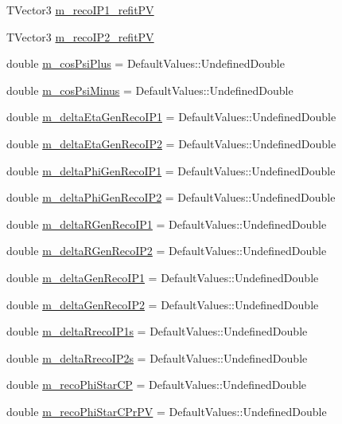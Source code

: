 \begin{DoxyCompactItemize}
\item 
TVector3 \hyperlink{classHttProduct_aea4fe73c340c52db4fe5a427d2cf9be5}{m\_\-recoIP1\_\-refitPV}
\item 
TVector3 \hyperlink{classHttProduct_ab6f1595deb54f67149fdcc3a30adf7fa}{m\_\-recoIP2\_\-refitPV}
\item 
double \hyperlink{classHttProduct_aff72a2230f489c350ef7c9e484ad1fe6}{m\_\-cosPsiPlus} = DefaultValues::UndefinedDouble
\item 
double \hyperlink{classHttProduct_a059c70723ea678b74ce0e482532a276e}{m\_\-cosPsiMinus} = DefaultValues::UndefinedDouble
\item 
double \hyperlink{classHttProduct_aac726a3ccc8029923223bcd08e75f010}{m\_\-deltaEtaGenRecoIP1} = DefaultValues::UndefinedDouble
\item 
double \hyperlink{classHttProduct_a57bff061908d353a2f651657bd8e4de1}{m\_\-deltaEtaGenRecoIP2} = DefaultValues::UndefinedDouble
\item 
double \hyperlink{classHttProduct_a4e55c66a5e3ec73aadb0a3917f727e7a}{m\_\-deltaPhiGenRecoIP1} = DefaultValues::UndefinedDouble
\item 
double \hyperlink{classHttProduct_a5bc17e1dd51ff83408e8cd70fc7b4d2d}{m\_\-deltaPhiGenRecoIP2} = DefaultValues::UndefinedDouble
\item 
double \hyperlink{classHttProduct_a74cf87b5a1e3860aea33859f66bfd15b}{m\_\-deltaRGenRecoIP1} = DefaultValues::UndefinedDouble
\item 
double \hyperlink{classHttProduct_afb7a0e37e07af8fba505256a0ff722ac}{m\_\-deltaRGenRecoIP2} = DefaultValues::UndefinedDouble
\item 
double \hyperlink{classHttProduct_a3d4aa891d7628157d9aabe530a1b1c86}{m\_\-deltaGenRecoIP1} = DefaultValues::UndefinedDouble
\item 
double \hyperlink{classHttProduct_a4ace48eb8ca08b83d4d7363639fa5dd5}{m\_\-deltaGenRecoIP2} = DefaultValues::UndefinedDouble
\item 
double \hyperlink{classHttProduct_a6b60262540f218d140d75aae2c052796}{m\_\-deltaRrecoIP1s} = DefaultValues::UndefinedDouble
\item 
double \hyperlink{classHttProduct_a2bf06664258fe38b2b7ee4c163e4ff7d}{m\_\-deltaRrecoIP2s} = DefaultValues::UndefinedDouble
\item 
double \hyperlink{classHttProduct_aa4bd2e24680c73548ed2fbc6b4ac7a19}{m\_\-recoPhiStarCP} = DefaultValues::UndefinedDouble
\item 
double \hyperlink{classHttProduct_a40b2f8b7d918c15baa3a1adc88e5bd84}{m\_\-recoPhiStarCPrPV} = DefaultValues::UndefinedDouble

\end{DoxyCompactItemize}
